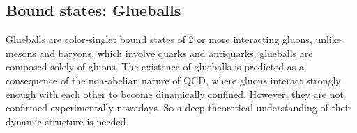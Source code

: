 \documentclass[11pt,a4paper,twoside,pdf]{article}
\numberwithin{equation}{section}
\begin{document}

\newpage

\subsection{Bound states: Glueballs}

Glueballs are color-singlet bound states of 2 or more interacting gluons, unlike mesons
and baryons, which involve quarks and antiquarks, glueballs are composed solely of gluons.
The existence of glueballs is predicted as a consequence of the non-abelian nature of QCD, where gluons
interact strongly enough with each other to become dinamically confined. However,
they are not confirmed experimentally nowadays. So a deep theoretical understanding of 
their dynamic structure is needed.
\end{document}
